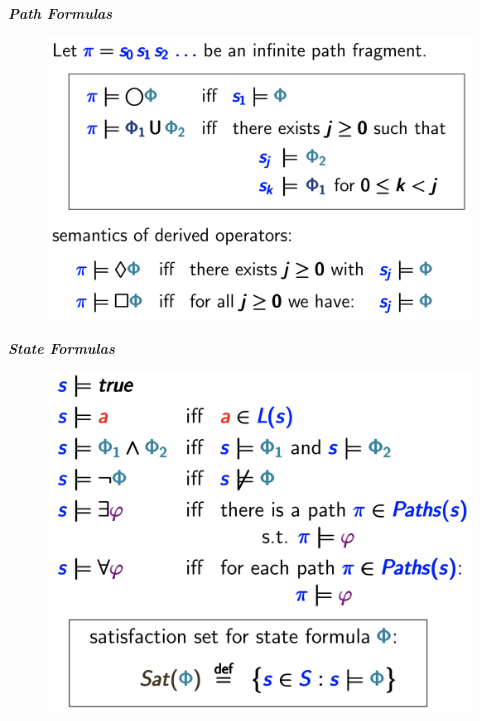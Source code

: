 \documentclass[a4paper, notitlepage, 9pt]{extreport}
\begin{document}
\begin{multicols}{2}
	\textit{\textbf{Path Formulas}}
	\begin{figure}[H]
		\centering
		\includegraphics[scale=0.133]{PATH}
	\end{figure}
\columnbreak
	\textit{\textbf{State Formulas}}
	\begin{figure}[H]
		\centering
		\includegraphics[scale=0.126]{STATE}
	\end{figure}
\end{multicols}
\end{document}
